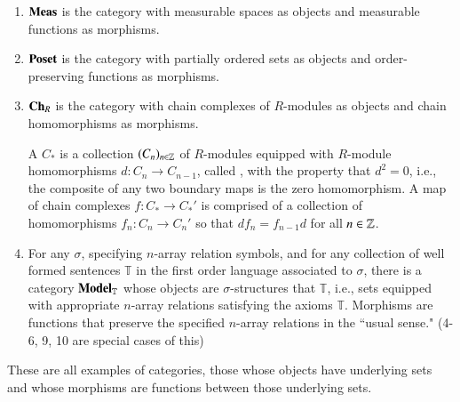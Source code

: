 \documentclass[12pt, a4paper, oneside, openright, titlepage]{book}
\begin{document}
\begin{eg}
\begin{enumerate}
        \item $\normalfont\textbf{Meas}$ is the category with measurable spaces as objects and measurable functions as morphisms. 
        \item $\normalfont\textbf{Poset}$ is the category with partially ordered sets as objects and order-preserving functions as morphisms.
        \item $\normalfont\textbf{Ch}_R$ is the category with chain complexes of $R$-modules as objects and chain homomorphisms as morphisms.
            \begin{defn}
                A  $C_*$ is a collection $(C_n)_{n \in \mathbb Z}$ of $R$-modules equipped with $R$-module homomorphisms $d:C_n\rightarrow C_{n-1}$, called , with the property that $d^2 = 0$, i.e., the composite of any two boundary maps is the zero homomorphism. A map of chain complexes $f:C_* \rightarrow C_*'$ is comprised of a collection of homomorphisms $f_n:C_n\rightarrow C_n'$ so that $df_n = f_{n-1}d$ for all $n \in \mathbb Z$.
            \end{defn}
        \item For any  $\sigma$, specifying $n$-array relation symbols, and for any collection of well formed sentences $\mathbb{T}$ in the first order language associated to $\sigma$, there is a category $\normalfont\textbf{Model}_{\mathbb{T}}$ whose objects are $\sigma$-structures that  $\mathbb{T}$, i.e., sets equipped with appropriate $n$-array relations satisfying the axioms $\mathbb{T}$. Morphisms are functions that preserve the specified $n$-array relations in the ``usual sense." (4-6, 9, 10 are special cases of this)
    \end{enumerate}
\end{eg}

These are all examples of  categories, those whose objects have underlying sets and whose morphisms are functions between those underlying sets.
\end{document}
